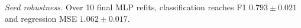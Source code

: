 \emph{Seed robustness.} Over 10 final MLP refits, classification reaches F1 $0.793\pm0.021$ and regression MSE $1.062\pm0.017$.
